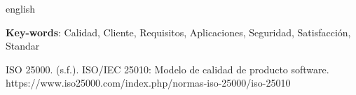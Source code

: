 \documentclass[
	article,			%
	11pt,				%
	oneside,			%
	a4paper,			%
	english,			%
	brazil,				%
	sumario=tradicional
	]{abntex2}
\begin{document}
% 








\emptythanks
\maketitle

\begin{columnaderesumen}
 \begin{otherlanguage*}{english}

   \vspace{\onelineskip}
 
   \noindent
   \textbf{Key-words}: Calidad, Cliente, Requisitos, Aplicaciones, Seguridad, Satisfacción, Standar
 \end{otherlanguage*}  
\end{columnaderesumen}




ISO 25000. (s.f.). ISO/IEC 25010: Modelo de calidad de producto software.  \\
https://www.iso25000.com/index.php/normas-iso-25000/iso-25010
\end{document}
